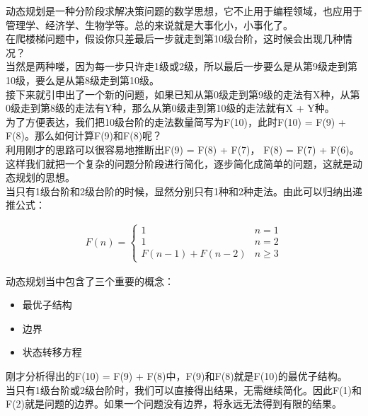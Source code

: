 动态规划是一种分阶段求解决策问题的数学思想，它不止用于编程领域，也应用于管理学、经济学、生物学等。总的来说就是大事化小，小事化了。 \\

在爬楼梯问题中，假设你只差最后一步就走到第10级台阶，这时候会出现几种情况？ \\

当然是两种喽，因为每一步只许走1级或2级，所以最后一步要么是从第9级走到第10级，要么是从第8级走到第10级。 \\

接下来就引申出了一个新的问题，如果已知从第0级走到第9级的走法有X种，从第0级走到第8级的走法有Y种，那么从第0级走到第10级的走法就有X + Y种。 \\

为了方便表达，我们把10级台阶的走法数量简写为F(10)，此时F(10) = F(9) + F(8)。那么如何计算F(9)和F(8)呢？ \\

利用刚才的思路可以很容易地推断出F(9) = F(8) + F(7)， F(8) = F(7) + F(6)。这样我们就把一个复杂的问题分阶段进行简化，逐步简化成简单的问题，这就是动态规划的思想。 \\

当只有1级台阶和2级台阶的时候，显然分别只有1种和2种走法。由此可以归纳出递推公式：

\vspace{-0.5cm}

\begin{align*}
	F(n) = \begin{cases}
		1               & n = 1   \\
		1               & n = 2   \\
		F(n-1) + F(n-2) & n \ge 3
	\end{cases}
\end{align*}

动态规划当中包含了三个重要的概念：

\begin{itemize}
	\item 最优子结构
	\item 边界
	\item 状态转移方程
\end{itemize}

刚才分析得出的F(10) = F(9) + F(8)中，F(9)和F(8)就是F(10)的最优子结构。 \\

当只有1级台阶或2级台阶时，我们可以直接得出结果，无需继续简化。因此F(1)和F(2)就是问题的边界。如果一个问题没有边界，将永远无法得到有限的结果。 \\

